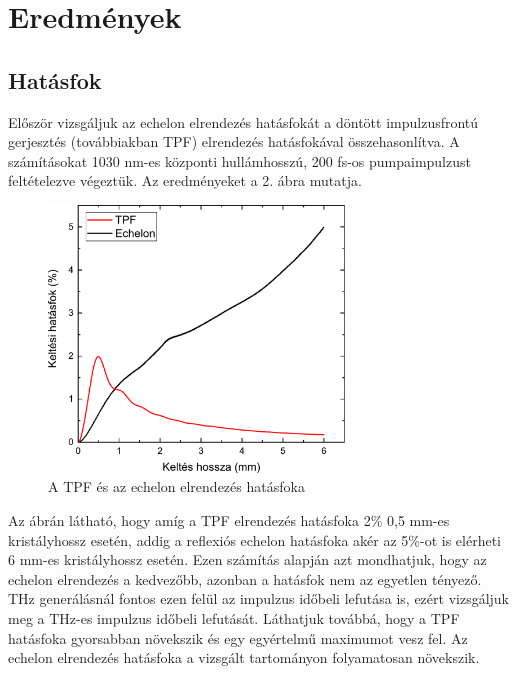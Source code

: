 \documentclass[12pt, a4paper]{article}
\begin{document}
\section{Eredmények}
\subsection*{Hatásfok}
Először vizsgáljuk az echelon elrendezés hatásfokát a döntött impulzusfrontú gerjesztés (továbbiakban TPF) elrendezés hatásfokával összehasonlítva. A számításokat 1030 nm-es központi hullámhosszú, 200 fs-os pumpaimpulzust feltételezve végeztük. Az eredményeket a 2. ábra mutatja.
\begin{figure}[H]
\centering
\includegraphics[width = 0.7\textwidth]{Origin/graph1.pdf}
\caption{A TPF és az echelon elrendezés hatásfoka}
\end{figure}
Az ábrán látható, hogy amíg a TPF elrendezés hatásfoka 2\% 0,5 mm-es kristályhossz esetén, addig a reflexiós echelon hatásfoka akér az 5\%-ot is elérheti 6 mm-es kristályhossz esetén. Ezen számítás alapján azt mondhatjuk, hogy az echelon elrendezés a kedvezőbb, azonban a hatásfok nem az egyetlen tényező. THz generálásnál fontos ezen felül az impulzus időbeli lefutása is, ezért vizsgáljuk meg a THz-es impulzus időbeli lefutását. Láthatjuk továbbá, hogy a TPF hatásfoka gyorsabban növekszik és egy egyértelmű maximumot vesz fel. Az echelon elrendezés hatásfoka a vizsgált tartományon folyamatosan növekszik.
\end{document}

